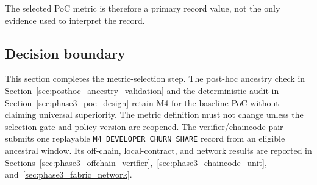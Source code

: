 The selected PoC metric is therefore a primary record value, not the only evidence used to interpret the record.

\subsection{Decision boundary}
\label{sec:selected_metric_decision_boundary}

This section completes the metric-selection step. The post-hoc ancestry check in
Section~\ref{sec:posthoc_ancestry_validation} and the deterministic audit in Section~\ref{sec:phase3_poc_design}
retain M4 for the baseline PoC without claiming universal superiority. The metric definition must not change unless
the selection gate and policy version are reopened. The verifier/chaincode pair submits one replayable
\texttt{M4\_DEVELOPER\_CHURN\_SHARE} record from an eligible ancestral window. Its off-chain, local-contract, and
network results are reported in Sections~\ref{sec:phase3_offchain_verifier},~\ref{sec:phase3_chaincode_unit},
and~\ref{sec:phase3_fabric_network}.
